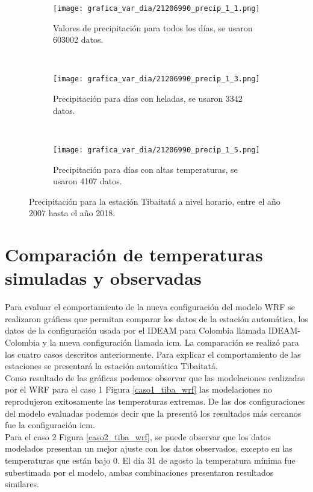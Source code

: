 \begin{figure}[H]
    \centering
    \begin{subfigure}[b]{0.45\textwidth}
    \caption{Valores de precipitación para todos los días, se usaron 603002 datos.}
	\texttt{[image: grafica\_var\_dia/21206990\_precip\_1\_1.png]}
    \label{subfig:prec_total}
	\end{subfigure}
	~
    \begin{subfigure}[b]{0.45\textwidth}
    \caption{Precipitación para días con heladas, se usaron 3342 datos.}
	\texttt{[image: grafica\_var\_dia/21206990\_precip\_1\_3.png]}
    \label{subfig:prec_min}
	\end{subfigure}
		~
    \begin{subfigure}[b]{0.45\textwidth}
    \caption{Precipitación para días con altas temperaturas, se usaron 4107 datos.}
	\texttt{[image: grafica\_var\_dia/21206990\_precip\_1\_5.png]}
    \label{subfig:prec_max}
	\end{subfigure}
	
    \caption{Precipitación para la estación Tibaitatá a nivel horario, entre el año 2007 hasta el año 2018.}
\end{figure}

\section{Comparación de temperaturas simuladas y observadas}

Para evaluar el comportamiento de la nueva configuración del modelo WRF se realizaron gráficas que permitan comparar los datos de la estación automática, los datos de la configuración usada por el IDEAM para Colombia llamada IDEAM-Colombia y la nueva configuración llamada icm. La comparación se realizó para los cuatro casos descritos anteriormente. Para explicar el comportamiento de las estaciones se presentará la estación automática Tibaitatá.\\

Como resultado de las gráficas podemos observar que las modelaciones realizadas por el WRF para el caso 1 Figura \ref{caso1_tiba_wrf} las modelaciones no reprodujeron exitosamente las temperaturas extremas. De las dos configuraciones del modelo evaluadas podemos decir que la presentó los resultados más cercanos fue la configuración icm.\\

Para el caso 2 Figura \ref{caso2_tiba_wrf}, se puede observar que los datos modelados presentan un mejor ajuste con los datos observados, excepto en las temperaturas que están bajo 0\celsius. El día 31 de agosto la temperatura mínima fue subestimada por el modelo, ambas combinaciones presentaron resultados similares.\\


